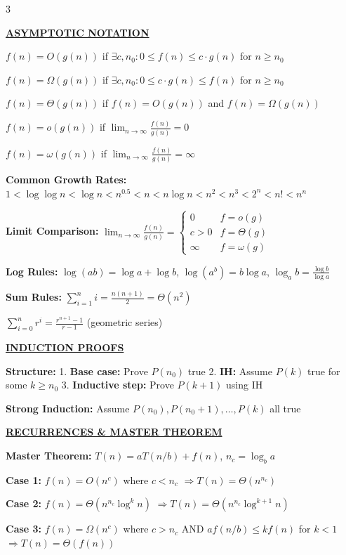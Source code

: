 \documentclass[7pt,landscape]{article}
\newcommand{\sect}[1]{\vspace{1mm}\textbf{\underline{#1}}\vspace{0.5mm}}
\begin{document}
\begin{multicols}{3}
\setlength{\columnsep}{0.4cm}
\small

\sect{ASYMPTOTIC NOTATION}

$f(n) = O(g(n))$ if $\exists c,n_0: 0 \leq f(n) \leq c \cdot g(n)$ for $n \geq n_0$

$f(n) = \Omega(g(n))$ if $\exists c,n_0: 0 \leq c \cdot g(n) \leq f(n)$ for $n \geq n_0$

$f(n) = \Theta(g(n))$ if $f(n) = O(g(n))$ and $f(n) = \Omega(g(n))$

$f(n) = o(g(n))$ if $\lim_{n\to\infty} \frac{f(n)}{g(n)} = 0$

$f(n) = \omega(g(n))$ if $\lim_{n\to\infty} \frac{f(n)}{g(n)} = \infty$

\textbf{Common Growth Rates:}
$1 < \log\log n < \log n < n^{0.5} < n < n\log n < n^2 < n^3 < 2^n < n! < n^n$

\textbf{Limit Comparison:}
$\lim_{n\to\infty} \frac{f(n)}{g(n)} = \begin{cases} 0 & f=o(g) \\ c>0 & f=\Theta(g) \\ \infty & f=\omega(g) \end{cases}$

\textbf{Log Rules:} $\log(ab) = \log a + \log b$, $\log(a^b) = b\log a$, $\log_a b = \frac{\log b}{\log a}$

\textbf{Sum Rules:} $\sum_{i=1}^n i = \frac{n(n+1)}{2} = \Theta(n^2)$

$\sum_{i=0}^n r^i = \frac{r^{n+1}-1}{r-1}$ (geometric series)

\sect{INDUCTION PROOFS}

\textbf{Structure:}
1. \textbf{Base case:} Prove $P(n_0)$ true
2. \textbf{IH:} Assume $P(k)$ true for some $k \geq n_0$
3. \textbf{Inductive step:} Prove $P(k+1)$ using IH

\textbf{Strong Induction:} Assume $P(n_0), P(n_0+1), \ldots, P(k)$ all true

\sect{RECURRENCES \& MASTER THEOREM}

\textbf{Master Theorem:} $T(n) = aT(n/b) + f(n)$, $n_c = \log_b a$

\textbf{Case 1:} $f(n) = O(n^c)$ where $c < n_c$ $\Rightarrow T(n) = \Theta(n^{n_c})$

\textbf{Case 2:} $f(n) = \Theta(n^{n_c} \log^k n)$ $\Rightarrow T(n) = \Theta(n^{n_c} \log^{k+1} n)$

\textbf{Case 3:} $f(n) = \Omega(n^c)$ where $c > n_c$ AND $af(n/b) \leq kf(n)$ for $k<1$ $\Rightarrow T(n) = \Theta(f(n))$


\end{multicols}
\end{document}

